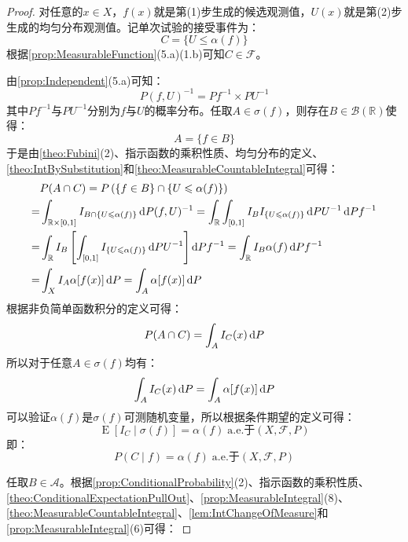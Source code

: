 \begin{proof}
	对任意的$x\in X$，$f(x)$就是第(1)步生成的候选观测值，$U(x)$就是第(2)步生成的均匀分布观测值。记单次试验的接受事件为：
	\begin{equation*}
		C=\{U\leqslant\alpha(f)\}
	\end{equation*}
	根据\cref{prop:MeasurableFunction}(5.a)(1.b)可知$C\in\mathscr{F}$。\par
	由\cref{prop:Independent}(5.a)可知：
	\begin{equation*}
		P(f,U)^{-1}=Pf^{-1}\times PU^{-1}
	\end{equation*}
	其中$Pf^{-1}$与$PU^{-1}$分别为$f$与$U$的概率分布。任取$A\in\sigma(f)$，则存在$B\in\mathcal{B}(\mathbb{R})$使得：
	\begin{equation*}
		A=\{f\in B\}
	\end{equation*}
	于是由\cref{theo:Fubini}(2)、指示函数的乘积性质、均匀分布的定义、\cref{theo:IntBySubstitution}和\cref{theo:MeasurableCountableIntegral}可得：
	\begin{align*}
		&P(A\cap C)=P\left(\{f\in B\}\cap\{U\leqslant\alpha(f)\}\right) \\
		=&\int_{\mathbb{R}\times[0,1]}I_{B\cap\{U\leqslant\alpha(f)\}}\dif P(f,U)^{-1}=\int_{\mathbb{R}}\int_{[0,1]}I_{B}I_{\{U\leqslant\alpha(f)\}}\dif PU^{-1}\dif Pf^{-1} \\
		=&\int_{\mathbb{R}}I_{B}\left[\int_{[0,1]}I_{\{U\leqslant\alpha(f)\}}\dif PU^{-1}\right]\dif Pf^{-1}=\int_{\mathbb{R}}I_{B}\alpha(f)\dif Pf^{-1} \\
		=&\int_{X}I_{A}\alpha[f(x)]\dif P=\int_{A}\alpha[f(x)]\dif P
	\end{align*}
	根据非负简单函数积分的定义可得：
	\begin{equation*}
		P(A\cap C)=\int_{A}I_C(x)\mathop{}\!\mathrm{d} P
	\end{equation*}
	所以对于任意$A\in\sigma(f)$均有：
	\begin{equation*}
		\int_{A}I_C(x)\mathop{}\!\mathrm{d} P=\int_{A}\alpha[f(x)]\mathop{}\!\mathrm{d} P
	\end{equation*}
	可以验证$\alpha(f)$是$\sigma(f)$可测随机变量，所以根据条件期望的定义可得：
	\begin{equation*}
		\operatorname{E}\left[I_C\mid\sigma(f)\right]=\alpha(f)\;\text{a.e.于$(X,\mathscr{F},P)$}
	\end{equation*}
	即：
	\begin{equation*}
		P(C\mid f)=\alpha(f)\;\text{a.e.于$(X,\mathscr{F},P)$}
	\end{equation*}\par
	任取$B\in\mathscr{A}$。根据\cref{prop:ConditionalProbability}(2)、指示函数的乘积性质、\cref{theo:ConditionalExpectationPullOut}、\cref{prop:MeasurableIntegral}(8)、\cref{theo:MeasurableCountableIntegral}、\cref{lem:IntChangeOfMeasure}和\cref{prop:MeasurableIntegral}(6)可得：

\end{proof}
